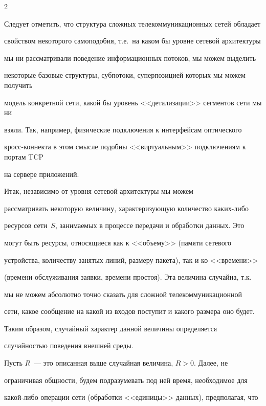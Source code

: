 \begin{multicols}{2}
\begin{figure}
\end{figure}





Следует отметить, что структура сложных телекоммуникационных сетей обладает


свойством некоторого самоподобия, т.е.\ на каком бы уровне сетевой архитектуры


мы ни рассматривали поведение информационных потоков, мы можем выделить


некоторые базовые структуры, субпотоки, суперпозицией которых мы можем получить


модель конкретной сети, какой бы уровень <<детализации>> сегментов сети мы ни


взяли. Так, например, физические подключения к интерфейсам оптического


кросс-коннекта в этом смысле подобны <<виртуальным>> подключениям к портам TCP


на сервере приложений.





Итак, независимо от уровня сетевой архитектуры мы можем


рассматривать некоторую величину, характеризующую количество каких-либо


ресурсов сети~$S$, занимаемых в процессе передачи и обработки данных.  Это


могут быть ресурсы, относящиеся как к <<объему>> (памяти сетевого


устройства, количеству занятых линий, размеру пакета), так и ко <<времени>>


(времени обслуживания заявки, времени простоя). Эта величина случайна, т.к.\


мы не можем абсолютно точно сказать для сложной телекоммуникационной


сети, какое сообщение на какой из входов поступит и какого размера оно будет.


Таким образом, случайный характер данной величины определяется


случайностью поведения внешней среды.





Пусть $R$~--- это описанная выше случайная величина, $R>0$. Далее, не


ограничивая общности, будем подразумевать под ней время, необходимое для


какой-либо операции сети (обработки <<единицы>> данных), предполагая, что



\end{multicols}
